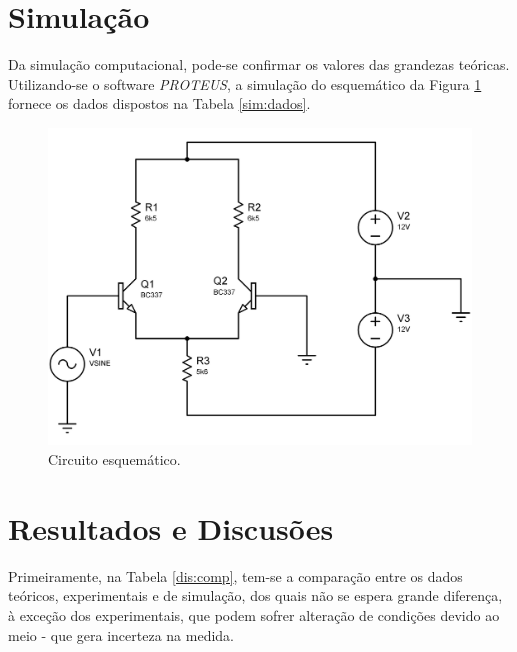 \documentclass[a4paper,12pt,oneside,openany,table,xcdraw]{article}
\begin{document}
\section{Simulação} %
Da simulação computacional, pode-se confirmar os valores das grandezas teóricas. Utilizando-se o software \emph{PROTEUS}, a simulação do esquemático da Figura \ref{sim:circuito} fornece os dados dispostos na Tabela \ref{sim:dados}.

 \vspace{0.5cm}
\begin{figure}[H]
\centering
\includegraphics[width=13cm]{sim-circuito}
\caption{Circuito esquemático.}
\label{sim:circuito}
\end{figure}
\vspace{0.5cm}


\section{Resultados e Discusões} %
Primeiramente, na Tabela \ref{dis:comp}, tem-se a comparação entre os dados teóricos, experimentais e de simulação, dos quais não se espera grande diferença, à exceção dos experimentais, que podem sofrer alteração de condições devido ao meio - que gera incerteza na medida.


\end{document}

